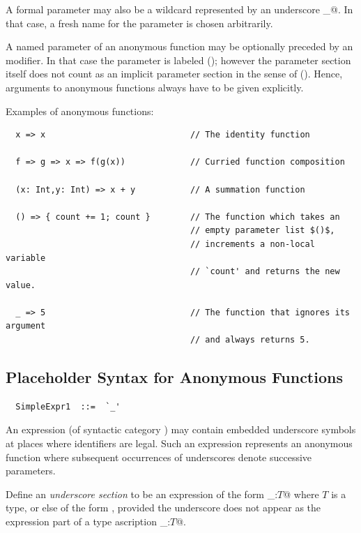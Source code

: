 A formal parameter may also be a wildcard represented by an underscore \lstinline@_@. 
In that case, a fresh name for the parameter is chosen arbitrarily.

A named parameter of an anonymous function may be optionally preceded
by an \lstinline@implicit@ modifier. In that case the parameter is
labeled \lstinline@implicit@ (); however the
parameter section itself does not count as an implicit parameter
section in the sense of (). Hence, arguments to
anonymous functions always have to be given explicitly.

\example Examples of anonymous functions:

\begin{lstlisting}
  x => x                             // The identity function

  f => g => x => f(g(x))             // Curried function composition

  (x: Int,y: Int) => x + y           // A summation function

  () => { count += 1; count }        // The function which takes an
                                     // empty parameter list $()$, 
                                     // increments a non-local variable 
                                     // `count' and returns the new value.

  _ => 5                             // The function that ignores its argument
                                     // and always returns 5.
\end{lstlisting}

\subsection*{Placeholder Syntax for Anonymous Functions}\label{sec:impl-anon-fun}

\syntax\begin{lstlisting}
  SimpleExpr1  ::=  `_'
\end{lstlisting}

An expression (of syntactic category \lstinline@Expr@)
may contain embedded underscore symbols \code{_} at places where identifiers
are legal. Such an expression represents an anonymous function where subsequent
occurrences of underscores denote successive parameters.

Define an {\em underscore section} to be an expression of the form
\lstinline@_:$T$@ where $T$ is a type, or else of the form \code{_},
provided the underscore does not appear as the expression part of a
type ascription \lstinline@_:$T$@.

